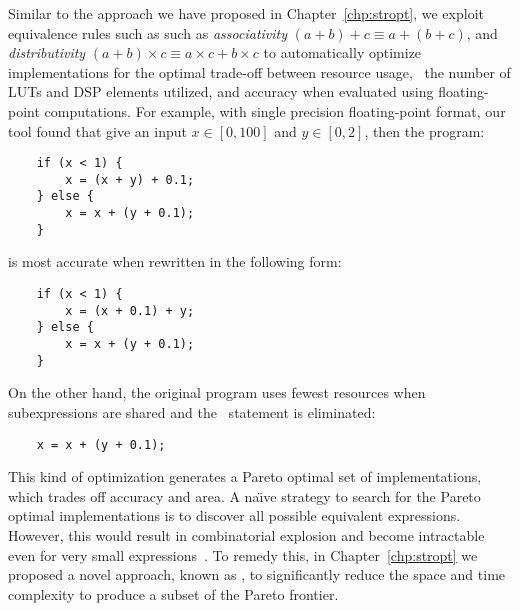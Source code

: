 
Similar to the approach we have proposed in Chapter~\ref{chp:stropt}, we
exploit equivalence rules such as such as \emph{associativity} $(a + b) +
c \equiv a + (b + c)$, and \emph{distributivity} $(a + b) \times c \equiv
a \times c + b \times c$ to automatically optimize implementations for
the optimal trade-off between resource usage, \ie~the number of LUTs and
DSP elements utilized, and accuracy when evaluated using floating-point
computations.  For example, with single precision floating-point format, our
tool found that give an input $x \in [0, 100]$ and $y \in [0, 2]$, then the
program:
\begin{lstlisting}
    if (x < 1) {
        x = (x + y) + 0.1;
    } else {
        x = x + (y + 0.1);
    }
\end{lstlisting}
is most accurate when rewritten in the following form:
\begin{lstlisting}
    if (x < 1) {
        x = (x + 0.1) + y;
    } else {
        x = x + (y + 0.1);
    }
\end{lstlisting}
On the other hand, the original program uses fewest resources when
subexpressions are shared and the \iflit~statement is eliminated:
\begin{lstlisting}
    x = x + (y + 0.1);
\end{lstlisting}

This kind of optimization generates a Pareto optimal set of implementations,
which trades off accuracy and area.  A na{\"\i}ve strategy to search for
the Pareto optimal implementations is to discover all possible equivalent
expressions.  However, this would result in combinatorial explosion and become
intractable even for very small expressions~\cite{ioualalen,mouilleron}.  To
remedy this, in Chapter~\ref{chp:stropt} we proposed a novel approach, known
as \soap, to significantly reduce the space and time complexity to produce a
subset of the Pareto frontier.


